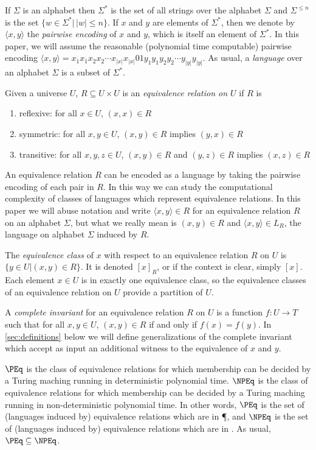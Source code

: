 \documentclass[draft]{article}
\theoremstyle{definition} \newtheorem{openproblem}[openproblem]{Open problem}
\theoremstyle{definition} \newtheorem{definition}[definition]{Definition}
\theoremstyle{remark} \newtheorem{remark}{Remark}
\newcommand{\defn}[1]{\emph{#1}} %
\newcommand{\pair}[2]{\langle#1,#2\rangle} %
\begin{document}
If $\Sigma$ is an alphabet then $\Sigma^*$ is the set of all strings over the alphabet $\Sigma$ and $\Sigma^{\leq n}$ is the set $\{w\in\Sigma^*|\,|w|\leq n\}$.
If $x$ and $y$ are elements of $\Sigma^*$, then we denote by $\pair{x}{y}$ the \defn{pairwise encoding} of $x$ and $y$, which is itself an element of $\Sigma^*$.
In this paper, we will assume the reasonable (polynomial time computable) pairwise encoding $\pair{x}{y}=x_1x_1x_2x_2\cdots x_{|x|}x_{|x|}01y_1y_1y_2y_2\cdots y_{|y|}y_{|y|}$.
As usual, a \defn{language} over an alphabet $\Sigma$ is a subset of $\Sigma^*$.

Given a universe $U$, $R\subseteq U\times U$ is an \defn{equivalence relation on $U$} if $R$ is
\begin{enumerate}
\item reflexive: for all $x\in U$, $(x,x)\in R$
\item symmetric: for all $x,y\in U$, $(x,y)\in R$ implies $(y,x)\in R$
\item transitive: for all $x,y,z\in U$, $(x,y)\in R$ and $(y,z)\in R$ implies $(x,z)\in R$
\end{enumerate}
An equivalence relation $R$ can be encoded as a language by taking the pairwise encoding of each pair in $R$.
In this way we can study the computational complexity of classes of languages which represent equivalence relations.
In this paper we will abuse notation and write $\pair{x}{y}\in R$ for an equivalence relation $R$ on an alphabet $\Sigma$, but what we really mean is $(x,y)\in R$ and $\pair{x}{y}\in L_R$, the language on alphabet $\Sigma$ induced by $R$.

The \defn{equivalence class} of $x$ with respect to an equivalence relation $R$ on $U$ is $\{y\in U|(x,y)\in R\}$. It is denoted $[x]_R$, or if the context is clear, simply $[x]$.
Each element $x\in U$ is in exactly one equivalence class, so the equivalence classes of an equivalence relation on $U$ provide a partition of $U$.

A \defn{complete invariant} for an equivalence relation $R$ on $U$ is a function $f\colon U\to T$ such that for all $x,y\in U$, $(x,y)\in R$ if and only if $f(x)=f(y)$.
In \autoref{sec:definitions} below we will define generalizations of the complete invariant which accept as input an additional witness to the equivalence of $x$ and $y$.

\defn{$\PEq$} is the class of equivalence relations for which membership can be decided by a Turing maching running in deterministic polynomial time.
\defn{$\NPEq$} is the class of equivalence relations for which membership can be decided by a Turing maching running in non-deterministic polynomial time.
In other words, $\PEq$ is the set of (languages induced by) equivalence relations which are in \P, and $\NPEq$ is the set of (languages induced by) equivalence relations which are in \NP.
As usual, $\PEq\subseteq\NPEq$.
\end{document}
